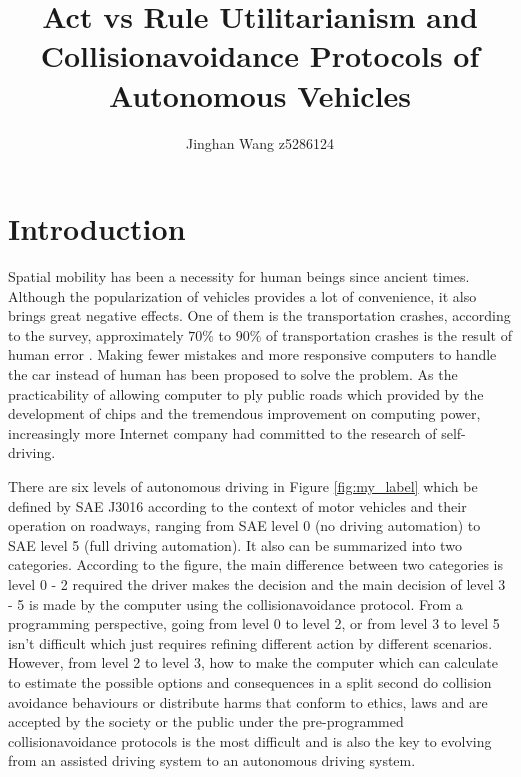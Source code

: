 \documentclass[9pt,twocolumn,twoside,lineno]{gsajnl}
\title{Act vs Rule Utilitarianism and Collisionavoidance Protocols of Autonomous Vehicles}
\author[1]{Jinghan Wang  z5286124}
\begin{document}
\maketitle
\thispagestyle{firststyle}
\vspace{-13pt}%

\section{Introduction}
Spatial mobility has been a necessity for human beings since ancient times. Although the popularization of vehicles provides a lot of convenience, it also brings great negative effects. One of them is the transportation crashes, according to the survey, approximately $70\%$ to $90\%$ of transportation crashes is the result of human error \citep{dhillon2007human}. Making fewer mistakes and more responsive computers to handle the car instead of human has been proposed to solve the problem. As the practicability of allowing computer to ply public roads which provided by the development of chips and the tremendous improvement on computing power, increasingly more Internet company had committed to the research of self-driving.

There are six levels of autonomous driving in Figure \ref{fig:my_label}  which be defined by SAE J3016 according to the context of motor vehicles and their operation on roadways, ranging from SAE level 0 (no driving automation) to SAE level 5 (full driving automation). It also can be summarized into two categories. According to the figure, the main difference between two categories is level 0 - 2 required the driver makes the decision and the main decision of level 3 - 5 is made by the computer using the collisionavoidance protocol. From a programming perspective, going from level 0 to level 2, or from level 3 to level 5 isn't difficult which just requires refining different action by different scenarios. However, from level 2 to level 3, how to make the computer which can calculate to estimate the possible options and consequences in a split second do collision avoidance behaviours or distribute harms that conform to ethics, laws and are accepted by the society or the public under the pre-programmed collisionavoidance protocols is the most difficult and is also the key to evolving from an assisted driving system to an autonomous driving system.
\end{document}
